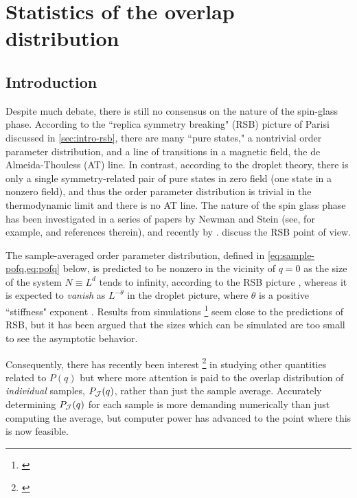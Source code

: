 \chapter{Statistics of the overlap distribution}
\label{chap:overlap}

\section{Introduction}

Despite much debate, there is still no consensus on the nature of the
spin-glass phase. According to the ``replica symmetry breaking" (RSB) picture
of Parisi discussed in \cref{sec:intro-rsb}, there are many ``pure states," a
nontrivial order parameter distribution, and a line of transitions in a
magnetic field, the de Almeida-Thouless (AT) line. In contrast, according to
the droplet theory, there is only a single symmetry-related pair of pure states
in zero field (one state in a nonzero field), and thus the order parameter
distribution is trivial in the thermodynamic limit and there is no AT line. The
nature of the spin glass phase has been investigated in a series of papers by
Newman and Stein (see, for example, \textcite{stein2013spin} and references
therein), and recently by \textcite{read2014short}.
\textcite{marinari2000replica} discuss the RSB point of view.

The sample-averaged order parameter distribution, defined in
\cref{eq:sample-pofq,eq:pofq} below, is predicted to be nonzero in the vicinity
of $q=0$ as the size of the system $N \equiv L^d$ tends to infinity, according
to the RSB picture \autocite{parisi1983order}, whereas it is expected to
\emph{vanish} as $L^{-\theta}$ in the droplet picture, where $\theta$ is a
positive ``stiffness" exponent \autocite{fisher1986ordered}.
Results from simulations%
\footnote{%
  \textcite{%
    marinari2000replica,%
    reger1990monte,%
    katzgraber2001monte,%
    katzgraber2003monte%
  }
}
seem close to the predictions of RSB, but it has been argued
\autocite{moore1998evidence,middleton2013extracting} that the sizes which can
be simulated are too small to see the asymptotic behavior.

Consequently, there has recently been interest%
\footnote{%
  \textcite{%
    middleton2013extracting,%
    yucesoy2012evidence,%
    monthus2013typical%
  }
}
in studying other quantities related to $P(q)$ but where more attention is paid
to the overlap distribution of \emph{individual} samples, $P_{\mathcal{J}}(q)$, rather
than just the sample average. Accurately determining $P_{\mathcal{J}}(q)$ for each
sample is more demanding numerically than just computing the average,
but computer power has advanced to the point where this is now feasible.

